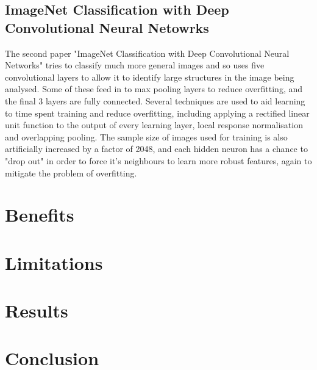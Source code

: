 \documentclass{article}
\begin{document}
\subsection{ImageNet Classification with Deep Convolutional Neural Netowrks}
The second paper "ImageNet Classification with Deep Convolutional Neural Networks" tries to classify much more general images and so uses five convolutional layers to allow it to identify large structures in the image being analysed\cite{imagenet}. Some of these feed in to max pooling layers to reduce overfitting, and the final 3 layers are fully connected. Several techniques are used to aid learning to time spent training and reduce overfitting, including applying a rectified linear unit function to the output of every learning layer, local response normalisation and overlapping pooling. The sample size of images used for training is also artificially increased by a factor of 2048, and each hidden neuron has a chance to "drop out" in order to force it's neighbours to learn more robust features, again to mitigate the problem of overfitting. 

\section{Benefits}

\section{Limitations}

\section{Results}

\section{Conclusion}



\end{document}
